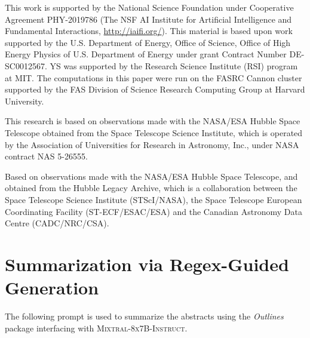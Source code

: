 \documentclass[10pt]{article} %
\newcommand{\package}[1]{\textsl{#1}\xspace}
\begin{document}
This work is supported by the National Science Foundation under Cooperative Agreement PHY-2019786 (The NSF AI Institute for Artificial Intelligence and Fundamental Interactions, \url{http://iaifi.org/}). This material is based upon work supported by the U.S. Department of Energy, Office of Science, Office of High Energy Physics of U.S. Department of Energy under grant Contract Number  DE-SC0012567. YS was supported by the Research Science Institute (RSI) program at MIT. The computations in this paper were run on the FASRC Cannon cluster supported by the FAS Division of Science Research Computing Group at Harvard University.

This research is based on observations made with the NASA/ESA Hubble Space Telescope obtained from the Space Telescope Science Institute, which is operated by the Association of Universities for Research in Astronomy, Inc., under NASA contract NAS 5-26555.

Based on observations made with the NASA/ESA Hubble Space Telescope, and obtained from the Hubble Legacy Archive, which is a collaboration between the Space Telescope Science Institute (STScI/NASA), the Space Telescope European Coordinating Facility (ST-ECF/ESAC/ESA) and the Canadian Astronomy Data Centre (CADC/NRC/CSA).





\appendix
\section{Summarization via Regex-Guided Generation}
\label{app:summarization}

The following prompt is used to summarize the abstracts using the \package{Outlines} package interfacing with \textsc{Mixtral-8x7B-Instruct}.
\end{document}
